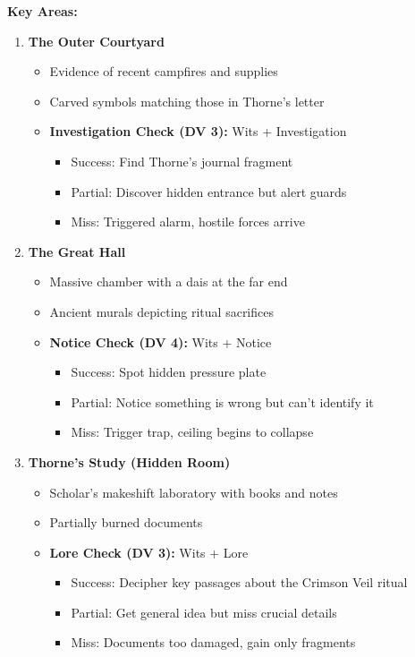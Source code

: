 \documentclass[11pt]{article}
\begin{document}
\textbf{Key Areas:}
\begin{enumerate}[leftmargin=*]
\item \textbf{The Outer Courtyard}
\begin{itemize}
\item Evidence of recent campfires and supplies
\item Carved symbols matching those in Thorne's letter
\item \textbf{Investigation Check (DV 3):} Wits + Investigation
\begin{itemize}
\item Success: Find Thorne's journal fragment
\item Partial: Discover hidden entrance but alert guards
\item Miss: Triggered alarm, hostile forces arrive
\end{itemize}
\end{itemize}

\item \textbf{The Great Hall}
\begin{itemize}
\item Massive chamber with a dais at the far end
\item Ancient murals depicting ritual sacrifices
\item \textbf{Notice Check (DV 4):} Wits + Notice
\begin{itemize}
\item Success: Spot hidden pressure plate
\item Partial: Notice something is wrong but can't identify it
\item Miss: Trigger trap, ceiling begins to collapse
\end{itemize}
\end{itemize}

\item \textbf{Thorne's Study (Hidden Room)}
\begin{itemize}
\item Scholar's makeshift laboratory with books and notes
\item Partially burned documents
\item \textbf{Lore Check (DV 3):} Wits + Lore
\begin{itemize}
\item Success: Decipher key passages about the Crimson Veil ritual
\item Partial: Get general idea but miss crucial details
\item Miss: Documents too damaged, gain only fragments
\end{itemize}
\end{itemize}
\end{enumerate}
\end{document}
